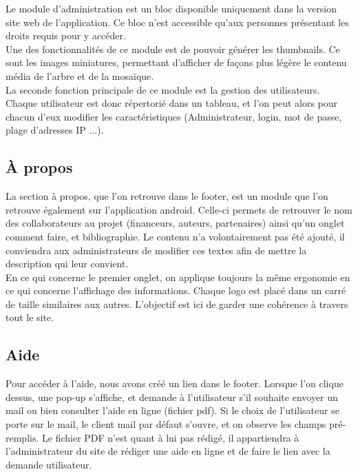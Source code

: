 \documentclass[twoside]{EPURapport}
\begin{document}
	Le module d'administration est un bloc disponible uniquement dans la version site web de l'application. Ce bloc n'est accessible qu'aux personnes présentant les droits requis pour y accéder.\\
	
	Une des fonctionnalités de ce module est de pouvoir générer les thumbnails. Ce sont les images miniatures, permettant d'afficher de façons plus légère le contenu média de l'arbre et de la mosaïque.\\
	
	La seconde fonction principale de ce module est la gestion des utilisateurs. Chaque utilisateur est donc répertorié dans un tableau, et l'on peut alors pour chacun d'eux modifier les caractéristiques (Administrateur, login, mot de passe, plage d'adresses IP ...).
		
		\subsection{À propos}
		
	La section à propos, que l'on retrouve dans le footer, est un module que l'on retrouve également sur l'application android. Celle-ci permets de retrouver le nom des collaborateurs au projet (financeurs, auteurs, partenaires) ainsi qu'un onglet comment faire, et bibliographie. Le contenu n'a volontairement pas été ajouté, il conviendra aux administrateurs de modifier ces textes afin de mettre la description qui leur convient.\\
	
	En ce qui concerne le premier onglet, on applique toujours la même ergonomie en ce qui concerne l'affichage des informations. Chaque logo est placé dans un carré de taille similaires aux autres. L'objectif est ici de garder une cohérence à travers tout le site.
	
	\subsection{Aide}
		
	Pour accéder à l'aide, nous avons créé un lien dans le footer. Lorsque l'on clique dessus, une pop-up s'affiche, et demande à l'utilisateur s'il souhaite envoyer un mail ou bien consulter l'aide en ligne (fichier pdf). Si le choix de l'utilisateur se porte sur le mail, le client mail par défaut s'ouvre, et on observe les champs pré-remplis. Le fichier PDF n'est quant à lui pas rédigé, il appartiendra à l'administrateur du site de rédiger une aide en ligne et de faire le lien avec la demande utilisateur.
		
\end{document}
